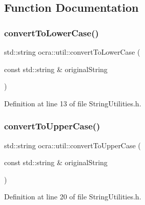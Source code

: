 \subsection{Function Documentation}
\hypertarget{namespaceocra_1_1util_a52405129ed430671a96cedd22bbfbd07}{}\label{namespaceocra_1_1util_a52405129ed430671a96cedd22bbfbd07} 
\subsubsection{\texorpdfstring{convert\+To\+Lower\+Case()}{convertToLowerCase()}}
{\footnotesize\ttfamily std\+::string ocra\+::util\+::convert\+To\+Lower\+Case (\begin{DoxyParamCaption}\item[{const std\+::string \&}]{original\+String }\end{DoxyParamCaption})\hspace{0.3cm}{\ttfamily [inline]}}



Definition at line 13 of file String\+Utilities.\+h.

\hypertarget{namespaceocra_1_1util_a98431f64f2119e4cb762c39e7959a531}{}\label{namespaceocra_1_1util_a98431f64f2119e4cb762c39e7959a531} 
\subsubsection{\texorpdfstring{convert\+To\+Upper\+Case()}{convertToUpperCase()}}
{\footnotesize\ttfamily std\+::string ocra\+::util\+::convert\+To\+Upper\+Case (\begin{DoxyParamCaption}\item[{const std\+::string \&}]{original\+String }\end{DoxyParamCaption})\hspace{0.3cm}{\ttfamily [inline]}}



Definition at line 20 of file String\+Utilities.\+h.

\hypertarget{namespaceocra_1_1util_a64b5072529ea69c67bc426e571972087}{}\label{namespaceocra_1_1util_a64b5072529ea69c67bc426e571972087} 
